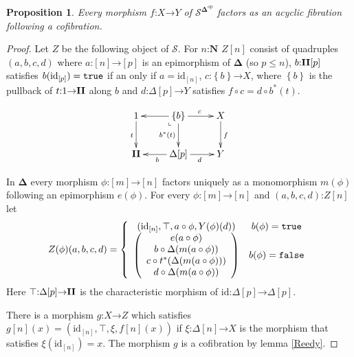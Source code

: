 \documentclass{amsart}
\theoremstyle{plain}
\newtheorem{prop}[theorem]{Proposition}
\theoremstyle{definition}
\newcommand\cat\mathcal
\newcommand\set[1]{\left\{#1\right\}}
\newcommand\id{\mathrm{id}}
\newcommand\ri{^*}
\newcommand\nno{\mathbf N}
\newcommand\dual{^{\mathrm{op}}}
\newcommand\simCat{\mathbf\Delta}
\newcommand\s{^{\simCat\dual}}
\newcommand\of{\mathord:}
\renewcommand\to{\mathord\rightarrow}
\newcommand\simplex\Delta
\begin{document}
\begin{prop} Every morphism $f\of X\to Y$ of $\cat S\s$ factors as an acyclic fibration following a cofibration. \label{factor1} \end{prop}

\begin{proof}
Let $Z$ be the following object of $\cat S$. For $n\of\nno$ $Z[n]$ consist of quadruples $(a,b,c,d)$ where 
 $a\of[n]\to [p]$ is an epimorphism of $\simCat$ (so $p\leq n$),
 $b\of\LDMC[p]$ satisfies $b(\id_{[p]})=\true$ if an only if $a=\id_{[n]}$,
 $c\of \set{b}\to X$, where $\set{b}$ is the pullback of $t\of 1\to\LDMC$ along $b$ and 
 $d\of \simplex[p]\to Y$ satisfies $f\circ c = d\circ b\ri(t)$.

\[\xymatrix{
1\ar[d]_t & \set b\ar[l]\ar[d]_{b\ri(t)}\ar@{}[dl]|<\llcorner\ar[r]^{c} & X\ar[d]^f \\
\LDMC & \simplex[p]\ar[l]^b\ar[r]_d & Y
}\]

In $\simCat$ every morphism $\phi\of [m]\to[n]$ factors uniquely as a monomorphism $m(\phi)$ following an epimorphism $e(\phi)$. For every $\phi\of [m]\to [n]$ and $(a,b,c,d)\of Z[n]$ let
\[ Z(\phi)(a,b,c,d) = \left\{\begin{array}{cc}
(\id_{[n]},\top,a\circ\phi,Y(\phi)(d)) & b(\phi)=\true \\
\left(\begin{array}{c} e(a\circ \phi)\\ b\circ \simplex(m(a\circ \phi))\\ c \circ t\ri(\simplex(m(a\circ \phi)))\\ d\circ\simplex(m(a\circ \phi))\end{array}\right) & b(\phi)=\false
\end{array}\right.
\]
Here $\top\of \simplex[p]\to\LDMC$ is the characteristic morphism of $\id\of\simplex[p]\to\simplex[p]$.

There is a morphism $g\of X\to Z$ which satisfies $g[n](x) = (\id_{[n]},\top,\xi,f[n](x))$ if $\xi\of\simplex[n] \to X$ is the morphism that satisfies $\xi(\id_{[n]})=x$. The morphism $g$ is a cofibration by lemma \ref{Reedy}.


\end{proof}
\end{document}
